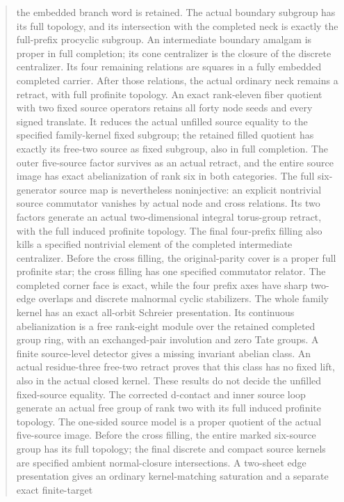 \documentclass[11pt,a4paper]{article}
\begin{document}
\begin{abstract}
the embedded branch word is retained. The actual boundary subgroup
has its full topology, and its intersection with the completed neck is
exactly the full-prefix procyclic subgroup. An intermediate boundary
amalgam is proper in full completion; its cone centralizer is the closure
of the discrete centralizer. Its four remaining relations are squares
in a fully embedded completed carrier. After those relations, the actual
ordinary neck remains a retract, with full profinite topology. An exact
rank-eleven fiber quotient with two fixed source operators retains all
forty node seeds and every signed translate. It reduces the actual
unfilled source equality to the specified family-kernel fixed subgroup;
the retained filled quotient has exactly its free-two source as fixed
subgroup, also in full completion. The outer five-source factor survives
as an actual retract, and the entire source image has exact abelianization
of rank six in both categories. The full six-generator source map is
nevertheless noninjective: an explicit nontrivial source commutator
vanishes by actual node and cross relations. Its two factors generate
an actual two-dimensional integral torus-group retract, with the full
induced profinite topology. The final four-prefix filling also kills a
specified nontrivial element of the completed intermediate centralizer.
Before the cross filling, the original-parity cover is a proper full
profinite star; the cross filling has one specified commutator relator.
The completed corner face is exact, while the four prefix axes have
sharp two-edge overlaps and discrete malnormal cyclic stabilizers.
The whole family kernel has an exact all-orbit Schreier presentation.
Its continuous abelianization is a free rank-eight module over the
retained completed group ring, with an exchanged-pair involution and
zero Tate groups. A finite source-level detector gives a missing
invariant abelian class. An actual residue-three free-two retract
proves that this class has no fixed lift, also in the actual closed
kernel. These results do not decide the unfilled fixed-source equality.
The corrected d-contact and inner source loop generate an actual free
group of rank two with its full induced profinite topology. The one-sided
source model is a proper quotient of the actual five-source image.
Before the cross filling, the entire marked six-source group has its
full topology; the final discrete and compact source kernels are specified
ambient normal-closure intersections. A two-sheet edge presentation gives
an ordinary kernel-matching saturation and a separate exact finite-target

\end{abstract}
\end{document}

